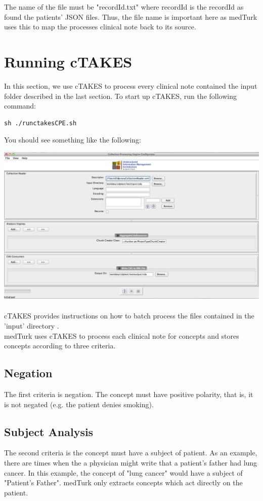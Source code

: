 \documentclass{book}
\begin{document}
The name of the file must be "recordId.txt" where recordId is the recordId as found the patients' JSON files. Thus, the file name is important here as medTurk uses this to map the processes clinical note back to its source.

\section{Running cTAKES}

In this section, we use cTAKES to process every clinical note contained the input folder described in the last section. To start up cTAKES, run the following command:

\begin{verbatim}
sh ./runctakesCPE.sh
\end{verbatim}

You should see something like the following:

\includegraphics[scale=0.3]{ctakes.png}~  \\[1cm]

cTAKES provides instructions on how to batch process the files contained in the 'input' directory .
\\
medTurk uses cTAKES to process each clinical note for concepts and stores concepts according to three criteria.

\subsection*{Negation}
The first criteria is negation. The concept must have positive polarity, that is, it is not negated (e.g. the patient denies smoking).

\subsection*{Subject Analysis}
The second criteria is the concept must have a subject of patient. As an example, there are times when the a physician might write that a patient's father had lung cancer. In this example, the concept of "lung cancer" would have a subject of "Patient's Father". medTurk only extracts concepts which act directly on the patient.
\end{document}
